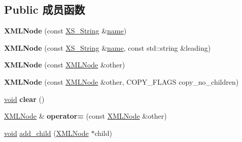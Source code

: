 \subsection*{Public 成员函数}
\begin{DoxyCompactItemize}
\item 
\mbox{\label{struct_x_m_l_storage_1_1_x_m_l_node_add00a76766a90d72ceb331bab8032b5b}} 
{\bfseries X\+M\+L\+Node} (const \hyperlink{struct_x_m_l_storage_1_1_x_s___string}{X\+S\+\_\+\+String} \&\hyperlink{structname}{name})
\item 
\mbox{\label{struct_x_m_l_storage_1_1_x_m_l_node_aca53021a3b19317da0b37db4107611bc}} 
{\bfseries X\+M\+L\+Node} (const \hyperlink{struct_x_m_l_storage_1_1_x_s___string}{X\+S\+\_\+\+String} \&\hyperlink{structname}{name}, const std\+::string \&leading)
\item 
\mbox{\label{struct_x_m_l_storage_1_1_x_m_l_node_aa78852f4ddb9d17293adc5accd4ca816}} 
{\bfseries X\+M\+L\+Node} (const \hyperlink{struct_x_m_l_storage_1_1_x_m_l_node}{X\+M\+L\+Node} \&other)
\item 
\mbox{\label{struct_x_m_l_storage_1_1_x_m_l_node_a36dabb087269985520868209f939aaee}} 
{\bfseries X\+M\+L\+Node} (const \hyperlink{struct_x_m_l_storage_1_1_x_m_l_node}{X\+M\+L\+Node} \&other, C\+O\+P\+Y\+\_\+\+F\+L\+A\+GS copy\+\_\+no\+\_\+children)
\item 
\mbox{\label{struct_x_m_l_storage_1_1_x_m_l_node_a529831a8b15642a63541e54e6e3682b4}} 
\hyperlink{interfacevoid}{void} {\bfseries clear} ()
\item 
\mbox{\label{struct_x_m_l_storage_1_1_x_m_l_node_a2f1eefb7b2253559fc3f521013375852}} 
\hyperlink{struct_x_m_l_storage_1_1_x_m_l_node}{X\+M\+L\+Node} \& {\bfseries operator=} (const \hyperlink{struct_x_m_l_storage_1_1_x_m_l_node}{X\+M\+L\+Node} \&other)
\item 
\mbox{\label{struct_x_m_l_storage_1_1_x_m_l_node_a69cf306aaf0f69f5e9acdeb268a07c9a}} 
\hyperlink{interfacevoid}{void} \hyperlink{struct_x_m_l_storage_1_1_x_m_l_node_a69cf306aaf0f69f5e9acdeb268a07c9a}{add\+\_\+child} (\hyperlink{struct_x_m_l_storage_1_1_x_m_l_node}{X\+M\+L\+Node} $\ast$child)

\end{DoxyCompactItemize}
